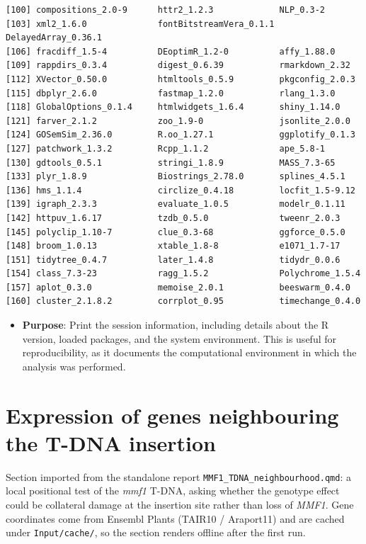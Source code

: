 \documentclass[
  11pt,
]{article}
\providecommand{\tightlist}{%
  \setlength{\itemsep}{0pt}\setlength{\parskip}{0pt}}\usepackage{longtable,booktabs,array}
\begin{document}
\begin{verbatim}
[100] compositions_2.0-9      httr2_1.2.3             NLP_0.3-2              
[103] xml2_1.6.0              fontBitstreamVera_0.1.1 DelayedArray_0.36.1    
[106] fracdiff_1.5-4          DEoptimR_1.2-0          affy_1.88.0            
[109] rappdirs_0.3.4          digest_0.6.39           rmarkdown_2.32         
[112] XVector_0.50.0          htmltools_0.5.9         pkgconfig_2.0.3        
[115] dbplyr_2.6.0            fastmap_1.2.0           rlang_1.3.0            
[118] GlobalOptions_0.1.4     htmlwidgets_1.6.4       shiny_1.14.0           
[121] farver_2.1.2            zoo_1.9-0               jsonlite_2.0.0         
[124] GOSemSim_2.36.0         R.oo_1.27.1             ggplotify_0.1.3        
[127] patchwork_1.3.2         Rcpp_1.1.2              ape_5.8-1              
[130] gdtools_0.5.1           stringi_1.8.9           MASS_7.3-65            
[133] plyr_1.8.9              Biostrings_2.78.0       splines_4.5.1          
[136] hms_1.1.4               circlize_0.4.18         locfit_1.5-9.12        
[139] igraph_2.3.3            evaluate_1.0.5          modelr_0.1.11          
[142] httpuv_1.6.17           tzdb_0.5.0              tweenr_2.0.3           
[145] polyclip_1.10-7         clue_0.3-68             ggforce_0.5.0          
[148] broom_1.0.13            xtable_1.8-8            e1071_1.7-17           
[151] tidytree_0.4.7          later_1.4.8             tidydr_0.0.6           
[154] class_7.3-23            ragg_1.5.2              Polychrome_1.5.4       
[157] aplot_0.3.0             memoise_2.0.1           beeswarm_0.4.0         
[160] cluster_2.1.8.2         corrplot_0.95           timechange_0.4.0       
\end{verbatim}

\begin{itemize}
\tightlist
\item
  \textbf{Purpose}: Print the session information, including details
  about the R version, loaded packages, and the system environment. This
  is useful for reproducibility, as it documents the computational
  environment in which the analysis was performed.
\end{itemize}

\section{Expression of genes neighbouring the T-DNA
insertion}\label{sec-tdna}

Section imported from the standalone report
\texttt{MMF1\_TDNA\_neighbourhood.qmd}: a local positional test of the
\emph{mmf1} T-DNA, asking whether the genotype effect could be
collateral damage at the insertion site rather than loss of \emph{MMF1}.
Gene coordinates come from Ensembl Plants (TAIR10 / Araport11) and are
cached under \texttt{Input/cache/}, so the section renders offline after
the first run.
\end{document}
